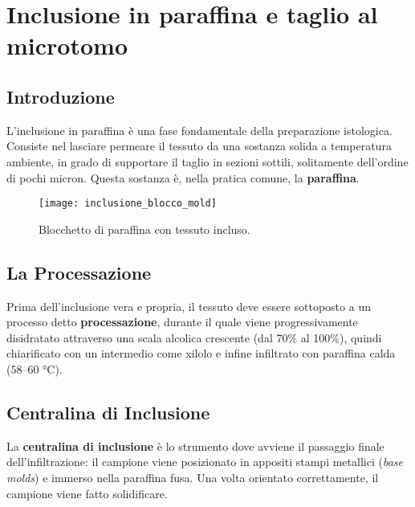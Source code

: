 \chapter{Inclusione in paraffina e taglio al microtomo}


\section{Introduzione}

L'inclusione in paraffina è una fase fondamentale della preparazione istologica. Consiste nel lasciare permeare il tessuto da una sostanza solida a temperatura ambiente, in grado di supportare il taglio in sezioni sottili, solitamente dell'ordine di pochi micron. Questa sostanza è, nella pratica comune, la \textbf{paraffina}.


 \begin{figure}[h]
 \centering
 \texttt{[image: inclusione\_blocco\_mold]} 
 \caption{Blocchetto di paraffina con tessuto incluso.}
 \end{figure}

\section{La Processazione}

Prima dell'inclusione vera e propria, il tessuto deve essere sottoposto a un processo detto \textbf{processazione}, durante il quale viene progressivamente disidratato attraverso una scala alcolica crescente (dal 70\% al 100\%), quindi chiarificato con un intermedio come xilolo e infine infiltrato con paraffina calda (58–60 °C).

\section{Centralina di Inclusione}

La \textbf{centralina di inclusione} è lo strumento dove avviene il passaggio finale dell'infiltrazione: il campione viene posizionato in appositi stampi metallici (\textit{base molds}) e immerso nella paraffina fusa. Una volta orientato correttamente, il campione viene fatto solidificare.


